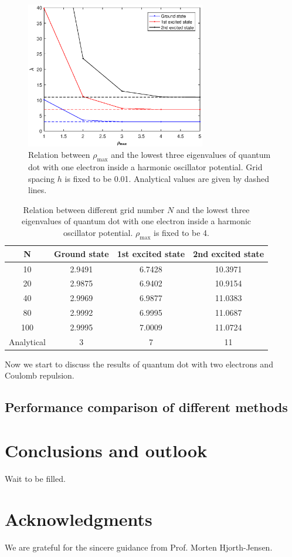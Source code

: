\documentclass{article}
\begin{document}
\begin{figure}[tb]
\label{fig:rmax_lambda}
\centering
\includegraphics[width=0.7\textwidth]{lambda_rmax.eps}
\caption{Relation between $\rho_{\max}$ and the lowest three eigenvalues of quantum dot with one electron inside a harmonic oscillator potential. Grid spacing $h$ is fixed to be 0.01. Analytical values are given by dashed lines. }
\end{figure}
\begin{table}[tb]
	\centering
	\caption{Relation between different grid number $N$ and the lowest three eigenvalues of quantum dot with one electron inside a harmonic oscillator potential. $\rho_{\max}$ is fixed to be 4. }
	\label{tab:diffN}
	\begin{tabular}{cccc}
		\hline
		\hline
		N   & Ground state & 1st excited state & 2nd excited state \\
		\hline
		10  & 2.9491 & 6.7428 & 10.3971 \\
		20  & 2.9875 & 6.9402 & 10.9154 \\
		40  & 2.9969 & 6.9877 & 11.0383 \\
		80  & 2.9992 & 6.9995 & 11.0687 \\
		100 & 2.9995 & 7.0009 & 11.0724 \\
		Analytical & 3 & 7 & 11 \\
		\hline
		\hline
	\end{tabular}
\end{table}
\par
Now we start to discuss the results of quantum dot with two electrons and Coulomb repulsion. 

	\subsection{Performance comparison of different methods}
	 
	
	\section{Conclusions and outlook}\label{conclude}
	Wait to be filled. 
	
	\section*{Acknowledgments}
	We are grateful for the sincere guidance from Prof. Morten Hjorth-Jensen. 
	
	\nocite{*} 
	
	
\end{document}
